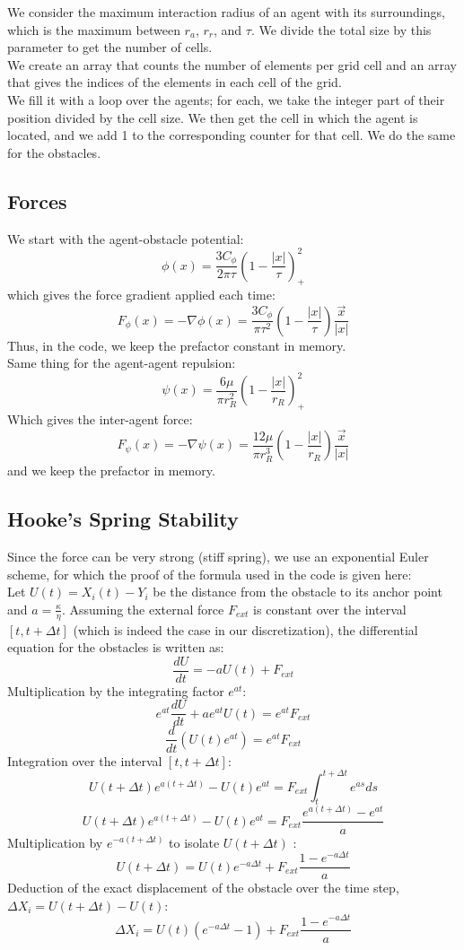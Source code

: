 \documentclass{article}
\begin{document}
We consider the maximum interaction radius of an agent with its surroundings, which is the maximum between $r_a$, $r_r$, and $\tau$. We divide the total size by this parameter to get the number of cells.\\
We create an array that counts the number of elements per grid cell and an array that gives the indices of the elements in each cell of the grid.\\
We fill it with a loop over the agents; for each, we take the integer part of their position divided by the cell size. We then get the cell in which the agent is located, and we add 1 to the corresponding counter for that cell. We do the same for the obstacles.

\subsection{Forces}

We start with the agent-obstacle potential:
$$
\phi(x) = \frac{3C_\phi}{2\pi\tau} \left(1 - \frac{|x|}{\tau}\right)_+^2
$$
which gives the force gradient applied each time:
$$
F_\phi(x) = -\nabla \phi(x) = \frac{3C_\phi}{\pi\tau^2} \left(1 - \frac{|x|}{\tau}\right) \frac{\vec{x}}{|x|}
$$
Thus, in the code, we keep the prefactor constant in memory.
\\
Same thing for the agent-agent repulsion:
$$
\psi(x) = \frac{6\mu}{\pi r_R^2} \left(1 - \frac{|x|}{r_R}\right)_+^2
$$
Which gives the inter-agent force:
$$
F_\psi(x) = -\nabla \psi(x) = \frac{12\mu}{\pi r_R^3} \left(1 - \frac{|x|}{r_R}\right) \frac{\vec{x}}{|x|}
$$
and we keep the prefactor in memory.

\subsection{Hooke's Spring Stability}
Since the force can be very strong (stiff spring), we use an exponential Euler scheme, for which the proof of the formula used in the code is given here:\\
Let $U(t) = X_i(t) - Y_i$ be the distance from the obstacle to its anchor point and $a = \frac{\kappa}{\eta}$. Assuming the external force $F_{ext}$ is constant over the interval $[t, t+\Delta t]$ (which is indeed the case in our discretization), the differential equation for the obstacles is written as:
$$\frac{dU}{dt} = -a U(t) + F_{ext}$$
Multiplication by the integrating factor $e^{at}$:
$$e^{at} \frac{dU}{dt} + a e^{at} U(t) = e^{at} F_{ext}$$
$$\frac{d}{dt} \left( U(t) e^{at} \right) = e^{at} F_{ext}$$
Integration over the interval $[t, t+\Delta t]$:
$$U(t+\Delta t) e^{a(t+\Delta t)} - U(t) e^{at} = F_{ext} \int_{t}^{t+\Delta t} e^{as} ds$$
$$U(t+\Delta t) e^{a(t+\Delta t)} - U(t) e^{at} = F_{ext} \frac{e^{a(t+\Delta t)} - e^{at}}{a}$$
Multiplication by $e^{-a(t+\Delta t)}$ to isolate $U(t+\Delta t)$ :$$U(t+\Delta t) = U(t) e^{-a\Delta t} + F_{ext} \frac{1 - e^{-a\Delta t}}{a}$$
Deduction of the exact displacement of the obstacle over the time step, $\Delta X_i = U(t+\Delta t) - U(t)$:$$\Delta X_i = U(t)(e^{-a\Delta t} - 1) + F_{ext} \frac{1 - e^{-a\Delta t}}{a}$$
\end{document}

